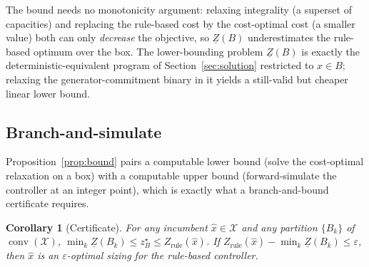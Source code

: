 \documentclass[11pt,a4paper]{article}
\theoremstyle{plain}
\newtheorem{corollary}{Corollary}
\theoremstyle{definition}
\begin{document}
The bound needs no monotonicity argument: relaxing integrality (a superset of capacities)
and replacing the rule-based cost by the cost-optimal cost (a smaller value) both can only
\emph{decrease} the objective, so $\underline{Z}(B)$ underestimates the rule-based optimum
over the box. The lower-bounding problem $\underline{Z}(B)$ is exactly the
deterministic-equivalent program of Section~\ref{sec:solution} restricted to $x\in B$;
relaxing the generator-commitment binary in it yields a still-valid but cheaper linear
lower bound.

\subsection{Branch-and-simulate}

Proposition~\ref{prop:bound} pairs a computable lower bound (solve the cost-optimal
relaxation on a box) with a computable upper bound (forward-simulate the controller at an
integer point), which is exactly what a branch-and-bound certificate requires.

\begin{corollary}[Certificate]
\label{cor:cert}
For any incumbent $\hat{x}\in\mathcal{X}$ and any partition $\{B_k\}$ of
$\operatorname{conv}(\mathcal{X})$,
$\min_k \underline{Z}(B_k)\le z_B^\star\le Z_{\mathrm{rule}}(\hat{x})$. If
$Z_{\mathrm{rule}}(\hat{x})-\min_k\underline{Z}(B_k)\le\varepsilon$, then $\hat{x}$ is an
$\varepsilon$-optimal sizing for the rule-based controller.
\end{corollary}
\end{document}
